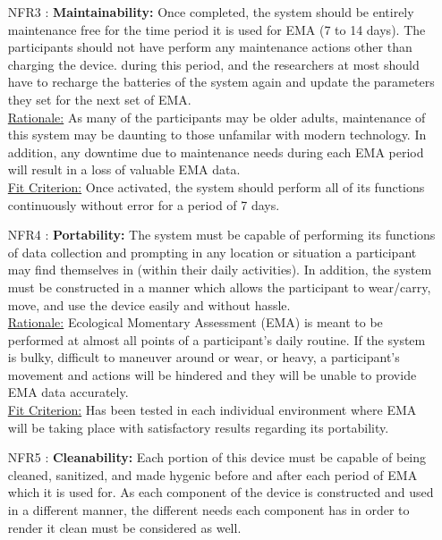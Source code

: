 \documentclass[12pt]{article}
\begin{document}
\begin{itemize}
\item[NFR3 \label{NFR3}:]
  \textbf{Maintainability:} Once completed, the system should be entirely maintenance free for the time period it is used for EMA (7 to 14 days). The participants should not have perform any maintenance actions other than charging the device. during this period, and the researchers at most should have to recharge the batteries of the system again and update the parameters they set for the next set of EMA.\\

\underline{Rationale:} As many of the participants may be older adults, maintenance of this system may be daunting to those unfamilar with modern technology. In addition, any downtime due to maintenance needs during each EMA period will result in a loss of valuable EMA data.\\

\underline{Fit Criterion:} Once activated, the system should perform all of its functions continuously without error for a period of 7 days.\\

\item[NFR4 \label{NFR4}:]
  \textbf{Portability:} The system must be capable of performing its functions of data collection and prompting in any location or situation a participant may find themselves in (within their daily activities). In addition, the system must be constructed in a manner which allows the participant to wear/carry, move, and use the device easily and without hassle.\\

\underline{Rationale:} Ecological Momentary Assessment (EMA) is meant to be performed at almost all points of a participant's daily routine. If the system is bulky, difficult to maneuver around or wear, or heavy, a participant's movement and actions will be hindered and they will be unable to provide EMA data accurately.\\


\underline{Fit Criterion:} Has been tested in each individual environment where EMA will be taking place with satisfactory results regarding its portability.\\


\item[NFR5 \label{NFR5}:]
  \textbf{Cleanability:} Each portion of this device must be capable of being cleaned, sanitized, and made hygenic before and after each period of EMA which it is used for. As each component of the device is constructed and used in a different manner, the different needs each component has in order to render it clean must be considered as well.\\



\end{itemize}
\end{document}
